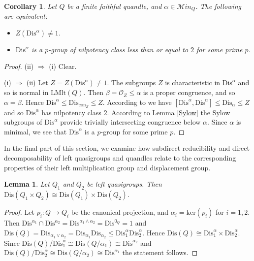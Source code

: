 \documentclass[a4paper, english, 9pt]{amsart}
\theoremstyle{plain}
\newtheorem{corollary}[theorem]{Corollary}
\newtheorem{lemma}[theorem]{Lemma}
\theoremstyle{definition}
\def\ker#1{\mathrm{ker}(#1)}
\def\lmlt{\mathrm{LMlt}}
\def\dis{\mathrm{Dis}}
\def\c#1{\mathrm{con}_{#1}}
\def\ma{\mathcal Min}
\begin{document}
\begin{corollary}\label{center of dis^alpha}
    Let $Q$ be a finite faithful quandle, and $\alpha\in \ma_Q$. The following are equivalent:
    \begin{itemize}
        \item[(i)] $Z(\dis^\alpha)\neq 1$.
        \item[(ii)] $\dis^\alpha$ is a $p$-group of nilpotency class less than or equal to $2$ for some prime $p$.
    \end{itemize}
\end{corollary}
\begin{proof}
    (ii) $\Rightarrow$ (i) Clear.

    (i) $\Rightarrow$ (ii) Let $Z=Z(\dis^\alpha)\neq 1$. The subgroups $Z$ is characteristic in $\dis^\alpha$ and so is normal in $\lmlt(Q)$. Then $\beta=\mathcal{O}_Z\leq \alpha$ is a proper congruence, and so $\alpha=\beta$. Hence $\dis^\alpha\leq \dis_{\c{Z}}\leq Z$. According to \cite[Propositon 3.3(1)]{CP} we have $[\dis^\alpha,\dis^\alpha]\leq \dis_\alpha\leq Z$ and so $\dis^\alpha$ has nilpotency class $2$. According to Lemma \ref{Sylow} the Sylow subgroups of $\dis^\alpha$ provide trivially intersecting congruence below $\alpha$. Since $\alpha$ is minimal, we see that $\dis^\alpha$ is a $p$-group for some prime $p$.
\end{proof}

In the final part of this section, we examine how subdirect reducibility and direct decomposability of left quasigroups and quandles relate to the corresponding properties of their left multiplication group and displacement group.
\begin{lemma}\label{DD LQGs}
Let $Q_1$ and $Q_2$ be left quasigroups. Then $\dis(Q_1\times Q_2)\cong \dis(Q_1)\times \dis(Q_2)$.
\end{lemma}
\begin{proof}
    Let $p_i:Q\longrightarrow Q_i$ be the canonical projection, and $\alpha_i=\ker{p_i}$ for $i=1,2$. Then $\dis^{\alpha_1}\cap \dis^{\alpha_2}=\dis^{\alpha_1\wedge\alpha_2}=\dis^{0_Q}=1$ and $\dis(Q)=\dis_{\alpha_1\vee \alpha_2}=\dis_{\alpha_1}\dis_{\alpha_2}\leq \dis^\alpha_1\dis^\alpha_2$. Hence $\dis(Q)\cong \dis^\alpha_1\times \dis^\alpha_2$. Since $\dis(Q)/\dis^\alpha_1\cong \dis(Q/\alpha_1)\cong \dis^{\alpha_2}$ and $\dis(Q)/\dis^\alpha_2\cong \dis(Q/\alpha_2)\cong \dis^{\alpha_1}$ the statement follows.
\end{proof}
\end{document}
